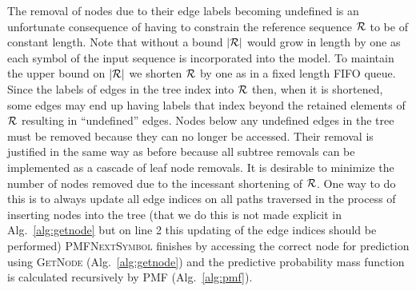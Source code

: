 The removal of nodes due to their edge labels becoming undefined is an unfortunate consequence of having to constrain the reference sequence $\RS$ to be of constant length.  Note that without a bound $|\RS|$ would grow in length by one as each symbol of the input sequence is incorporated into the model.  To maintain the upper bound on $|\RS|$ we shorten $\RS$ by one as in a fixed length FIFO queue. Since the labels of edges in the tree index into $\RS$ then, when it is shortened, some edges may end up having labels that index beyond the retained elements of $\RS$ resulting in ``undefined'' edges.  Nodes below any undefined edges in the tree must be removed because they can no longer be accessed.  Their removal is justified in the same way as before because all subtree removals can be implemented as a cascade of leaf node removals.  It is desirable to minimize the number of nodes removed due to the incessant shortening of $\RS$.  One way to do this is to always update all edge indices on all paths traversed in the process of inserting nodes into the tree (that we do this is not made explicit in Alg.~\ref{alg:getnode} but on line 2 this updating of the edge indices should be performed)   \textsc{PMFNextSymbol} finishes by accessing the correct node for prediction using \textsc{GetNode} (Alg.~\ref{alg:getnode}) and the predictive probability mass function is calculated recursively by \textsc{PMF} (Alg.~\ref{alg:pmf}).

